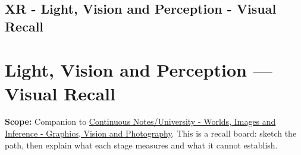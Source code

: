 \hypertarget{appendix-73c6b8ed5a87}{}
\section*{XR - Light, Vision and Perception - Visual Recall}
\chapter{Light, Vision and Perception --- Visual Recall}\label{appendix-73c6b8ed5a87-light-vision-and-perception-visual-recall}

\textbf{Scope:} Companion to \href{Continuous\%20Notes/University\%20-\%20Worlds,\%20Images\%20and\%20Inference\%20-\%20Graphics,\%20Vision\%20and\%20Photography}{Continuous Notes/University - Worlds, Images and Inference - Graphics, Vision and Photography}. This is a recall board: sketch the path, then explain what each stage measures and what it cannot establish.

